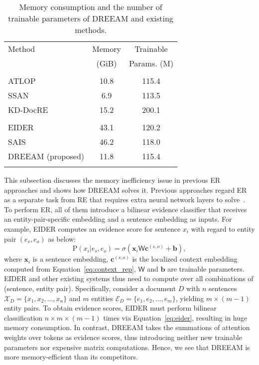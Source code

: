 \documentclass[11pt]{article}
\newcommand{\setX}{\mathcal{X}}
\newcommand{\setE}{\mathcal{E}}
\begin{document}
\label{sec:memory}

\begin{table}[t]
    \centering
    \small
    \begin{tabular}{lcc}
    \Xhline{3\arrayrulewidth}
    Method &  Memory & Trainable \\
    & (GiB) & Params. (M) \\
     \Xhline{3\arrayrulewidth}
    \multicolumn{3}{l}{\textbf{(a) without ER Module}} \\
    ATLOP~\cite{zhou2021atlop} & 10.8 & 115.4\\
    SSAN~\cite{xu-etal-2021-ssan} & 6.9 & 113.5\\
    KD-DocRE~\cite{tan-etal-2022-document} & 15.2 & 200.1 \\
    \Xhline{2\arrayrulewidth}
    \multicolumn{2}{l}{\textbf{(b) with ER Module}} \\
    EIDER~\cite{xie-etal-2022-eider} & 43.1 & 120.2 \\
    SAIS~\cite{xiao-etal-2022-sais} & 46.2 & 118.0 \\
    DREEAM (proposed) & 11.8 & 115.4 \\
    \Xhline{3\arrayrulewidth}
    \end{tabular}
    \caption{Memory consumption and the number of trainable parameters of DREEAM and existing methods.}
    \label{tab:memory}
\end{table}

This subsection discusses the memory inefficiency issue in previous ER approaches and shows how DREEAM solves it.
Previous approaches regard ER as a separate task from RE that requires extra neural network layers to solve~\cite{huang-etal-2021-entity,xie-etal-2022-eider,xiao-etal-2022-sais}.
To perform ER, all of them introduce a bilinear evidence classifier that receives an entity-pair-specific embedding and a sentence embedding as inputs.
For example, EIDER computes an evidence score for sentence $x_i$ with regard to entity pair $(e_s,e_o)$ as below:
\begin{equation}
    \mathrm{P}(x_i|e_s,e_o) = \sigma (\bm{x}_i\mathsf{W}\bm{c}^{(s,o)} + \bm{b}),
    \label{eq:eider}
\end{equation}
where $\bm{x}_i$ is a sentence embedding, $\bm{c}^{(s,o)}$ is the localized context embedding computed from Equation~\ref{eq:context_rep}, $\mathsf{W}$ and $\bm{b}$ are trainable parameters.
EIDER and other existing systems thus need to compute over all combinations of (sentence, entity pair).
Specifically, consider a document $D$ with $n$ sentences $\setX_D=\{x_1,x_2,\dots,x_n\}$ and $m$ entities $\setE_D=\{e_1,e_2,\dots,e_m\}$, yielding $m\times(m-1)$ entity pairs.
To obtain evidence scores, EIDER must perform bilinear classification $n\times m\times(m-1)$ times via Equation~\ref{eq:eider}, resulting in huge memory consumption.
In contrast, DREEAM takes the summations of attention weights over tokens as evidence scores, thus introducing neither new trainable parameters nor expensive matrix computations.
Hence, we see that DREEAM is more memory-efficient than its competitors.
\end{document}
